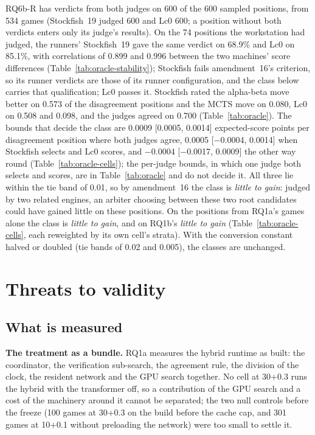 \documentclass{article}
\begin{document}
RQ6b-R has verdicts from both judges on 600 of the 600 sampled positions, from 534 games (Stockfish~19 judged 600 and Lc0 600; a position without both verdicts enters only its judge's results). On the 74 positions the workstation had judged, the runners' Stockfish~19 gave the same verdict on 68.9\% and Lc0 on 85.1\%, with correlations of 0.899 and 0.996 between the two machines' score differences (Table~\ref{tab:oracle-stability}); Stockfish fails amendment~16's criterion, so its runner verdicts are those of its runner configuration, and the class below carries that qualification; Lc0 passes it. Stockfish rated the alpha-beta move better on 0.573 of the disagreement positions and the MCTS move on 0.080, Lc0 on 0.508 and 0.098, and the judges agreed on 0.700 (Table~\ref{tab:oracle}). The bounds that decide the class are 0.0009 [0.0005, 0.0014] expected-score points per disagreement position where both judges agree, 0.0005 [$-$0.0004, 0.0014] when Stockfish selects and Lc0 scores, and $-$0.0004 [$-$0.0017, 0.0009] the other way round (Table~\ref{tab:oracle-cells}); the per-judge bounds, in which one judge both selects and scores, are in Table~\ref{tab:oracle} and do not decide it. All three lie within the tie band of 0.01, so by amendment~16 the class is \emph{little to gain}: judged by two related engines, an arbiter choosing between these two root candidates could have gained little on these positions. On the positions from RQ1a's games alone the class is \emph{little to gain}, and on RQ1b's \emph{little to gain} (Table~\ref{tab:oracle-cells}, each reweighted by its own cell's strata). With the conversion constant halved or doubled (tie bands of 0.02 and 0.005), the classes are unchanged.

\section{Threats to validity}
\label{sec:threats}
\subsection{What is measured}
\textbf{The treatment as a bundle.} RQ1a measures the hybrid runtime as built: the coordinator, the verification sub-search, the agreement rule, the division of the clock, the resident network and the GPU search together. No cell at 30+0.3 runs the hybrid with the transformer off, so a contribution of the GPU search and a cost of the machinery around it cannot be separated; the two null controls before the freeze (100 games at 30+0.3 on the build before the cache cap, and 301 games at 10+0.1 without preloading the network) were too small to settle it.
\end{document}
